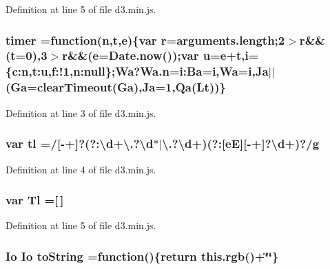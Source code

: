 Definition at line 5 of file d3.\+min.\+js.

\subsubsection[{timer}]{ timer =function({\bf n},t,{\bf e})\{var {\bf r}=arguments.\+length;2$>${\bf r}\&\&(t=0),3$>${\bf r}\&\&({\bf e}={\bf Date.\+now}());var u={\bf e}+t,{\bf i}=\{c\+:n,t\+:u,f\+:!1,n\+:null\};{\bf Wa}?{\bf Wa.\+n}=i\+:\+Ba={\bf i},{\bf Wa}={\bf i},{\bf Ja}$\vert$$\vert$({\bf Ga}=clear\+Timeout({\bf Ga}),{\bf Ja}=1,{\bf Qa}(Lt))\}}\label{d3_8min_8js_a814cae1b26cd87ad18fc6f6e83cef5c8}


Definition at line 3 of file d3.\+min.\+js.

\subsubsection[{tl}]{\setlength{\rightskip}{0pt plus 5cm}var tl =/[-\/+]?(?\+:\textbackslash{}{\bf d}+\textbackslash{}.?\textbackslash{}{\bf d}$\ast$$\vert$\textbackslash{}.?\textbackslash{}{\bf d}+)(?\+:[e\+E][-\/+]?\textbackslash{}{\bf d}+)?/g}\label{d3_8min_8js_ad1af5a3473ff917fc6b75a6c2d6cd8b2}


Definition at line 4 of file d3.\+min.\+js.

\subsubsection[{Tl}]{\setlength{\rightskip}{0pt plus 5cm}var Tl =[$\,$]}\label{d3_8min_8js_a637c94907151b081bc6e041731fc5369}


Definition at line 5 of file d3.\+min.\+js.

\subsubsection[{to\+String}]{ {\bf Io} {\bf Io} to\+String =function()\{{\bf return} {\bf this.\+rgb}()+\char`\"{}\char`\"{}\}}\label{d3_8min_8js_ae8d464aecf1079781cef541fb9e18b3d}


